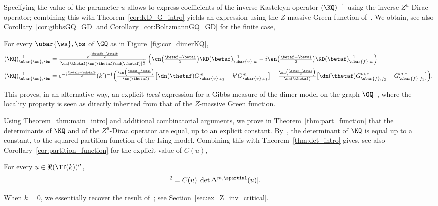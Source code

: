 \documentclass[a4paper,twoside,11pt]{article}
\begin{document}
Specifying the value of the parameter $u$ allows to express coefficients of the inverse Kasteleyn operator $(\KQ)^{-1}$
using the inverse $Z^u$-Dirac operator; combining this with Theorem~\ref{cor:KD_G_intro} yields an expression using the $Z$-massive 
Green function of~\cite{BdTR1}. We obtain, see also Corollary~\ref{cor:gibbsGQ_GD} and Corollary~\ref{cor:BoltzmannGQ_GD} for the finite case,
\begin{cor}\label{cor:gibbsGQ_GD_intro}
For every $\ubar{\ws},\bs$ of $\GQ$ as in Figure~\ref{fig:cor_dimerKQ},
\begin{align*}
(\KQ)^{-1}_{\ubar{\ws},\bs}&=\textstyle\frac{
e^{i\frac{\betafb-\betaib}{2}}}
{[\cn(\thetaf)\sn(\thetaf)\nd(\thetaf)]^{\frac{1}{2}}}
\left(\cn\bigl(\frac{\betaf-\betai}{2}\bigr)\KD(\betaf)^{-1}_{\ubar{v},w}
-i\sn\bigl(\frac{\betaf-\betai}{2}\bigr)\KD(\betaf)^{-1}_{\ubar{f},w}
\right)\\
(\KQ)^{-1}_{\ubar{\ws},\bs}&=\textstyle e^{-i\frac{\betaib+\alphafb}{2}}(k')^{-1}
\Bigl(\frac{\cn\bigl(\frac{\betaf-\betai}{2}\bigr)}{\cn(\thetaf)}
\bigl[\dn(\thetaf) G^m_{\ubar{v},v_2}-k'G^m_{\ubar{v},v_1}\bigr]
-\frac{\sn\bigl(\frac{\betaf-\betai}{2}\bigr)}{\sn(\thetaf)}
\bigl[\dn(\thetaf)G^{m,*}_{\ubar{f},f_2}-G^{m,*}_{\ubar{f},f_1}\bigr]\Bigr).
\end{align*}
\end{cor}
This proves, in an alternative way, an explicit \emph{local} expression for a Gibbs measure of the dimer model on the graph $\GQ$~\cite{BdtR2},
where the locality property is seen as directly inherited from that of the $Z$-massive Green function.

Using Theorem~\ref{thm:main_intro} and additional combinatorial arguments, we prove in Theorem~\ref{thm:part_function} that the determinants of $\KQ$ and of 
the $Z^u$-Dirac operator are equal, up to an explicit constant. By~\cite{Dubedat}, the determinant of $\KQ$ is equal up to a constant, 
to the squared partition function of the Ising model. Combining this with Theorem~\ref{thm:det_intro} gives, see 
also Corollary~\ref{cor:partition_function} for the explicit value of $C(u)$,
\begin{thm}\label{cor:partition_function_intro}
For every $u\in\Re(\TT(k))''$,
\begin{align*}
[\Zising^+(\Gs,\Js)]^2&=C(u) |\det \Delta^{m,\spartial}(u)|.
\end{align*}
\end{thm} 
When $k=0$, we essentially recover the result of~\cite{deTiliere:partition}; see Section~\ref{sec:ex_Z_inv_critical}.
\end{document}
